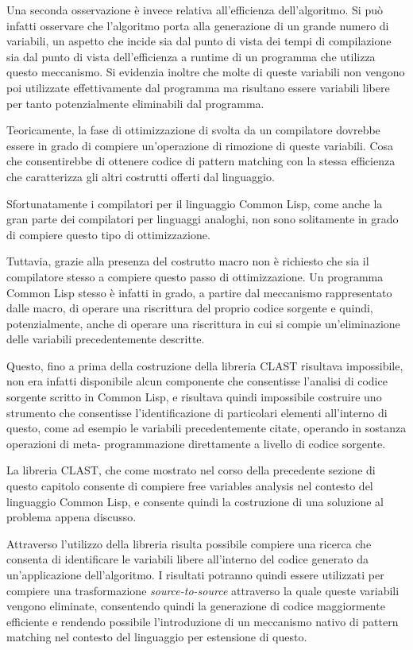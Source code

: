 Una seconda osservazione è invece relativa all'efficienza dell'algoritmo. Si può
infatti osservare che l'algoritmo porta alla generazione di un grande numero di
variabili, un aspetto che incide sia dal punto di vista dei tempi di
compilazione sia dal punto di vista dell'efficienza a runtime di un programma
che utilizza questo meccanismo. Si evidenzia inoltre che molte di queste
variabili non vengono poi utilizzate effettivamente dal programma ma risultano
essere variabili libere per tanto potenzialmente eliminabili dal programma.

Teoricamente, la fase di ottimizzazione di svolta da un compilatore dovrebbe
essere in grado di compiere un'operazione di rimozione di queste variabili. Cosa
che consentirebbe di ottenere codice di pattern matching con la stessa
efficienza che caratterizza gli altri costrutti offerti dal linguaggio.

Sfortunatamente i compilatori per il linguaggio Common Lisp, come anche la gran
parte dei compilatori per linguaggi analoghi, non sono solitamente in grado di
compiere questo tipo di ottimizzazione.

Tuttavia, grazie alla presenza del costrutto macro non è richiesto che sia il
compilatore stesso a compiere questo passo di ottimizzazione. Un programma
Common Lisp stesso è infatti in grado, a partire dal meccanismo rappresentato
dalle macro, di operare una riscrittura del proprio codice sorgente e quindi,
potenzialmente, anche di operare una riscrittura in cui si compie
un'eliminazione delle variabili precedentemente descritte.

Questo, fino a prima della costruzione della libreria CLAST risultava
impossibile, non era infatti disponibile alcun componente che consentisse
l'analisi di codice sorgente scritto in Common Lisp, e risultava quindi
impossibile costruire uno strumento che consentisse l'identificazione di
particolari elementi all'interno di questo, come ad esempio le variabili
precedentemente citate, operando in sostanza operazioni di meta- programmazione
direttamente a livello di codice sorgente.

La libreria CLAST, che come mostrato nel corso della precedente sezione di
questo capitolo consente di compiere free variables analysis nel contesto del
linguaggio Common Lisp, e consente quindi la costruzione di una soluzione al
problema appena discusso.

Attraverso l'utilizzo della libreria risulta possibile compiere una ricerca che
consenta di identificare le variabili libere all'interno del codice generato da
un'applicazione dell'algoritmo. I risultati potranno quindi essere utilizzati
per compiere una trasformazione \textit{source-to-source} attraverso la quale
queste variabili vengono eliminate, consentendo quindi la generazione di codice
maggiormente efficiente e rendendo possibile l'introduzione di un meccanismo
nativo di pattern matching nel contesto del linguaggio per estensione di
questo.

